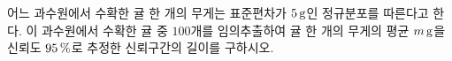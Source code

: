 어느 과수원에서 수확한 귤 한 개의 무게는 표준편차가 $5\mkern3mu \mathrm{g}$인 정규분포를 따른다고 한다. 이 과수원에서 수확한 귤 중 $100$개를 임의추출하여 귤 한 개의 무게의 평균 $m\mkern3mu \mathrm{g}$을 신뢰도 $95\mkern3mu \%$로 추정한 신뢰구간의 길이를 구하시오. 
